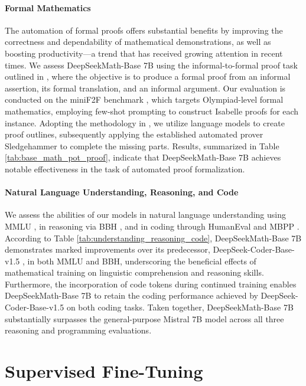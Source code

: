 \begin{itemize}[topsep=0pt]
\paragraph{Formal Mathematics}

The automation of formal proofs offers substantial benefits by improving the correctness and dependability of mathematical demonstrations, as well as boosting productivity—a trend that has received growing attention in recent times. We assess DeepSeekMath-Base 7B using the informal-to-formal proof task outlined in \citep{dsp_proof}, where the objective is to produce a formal proof from an informal assertion, its formal translation, and an informal argument. Our evaluation is conducted on the miniF2F benchmark \citep{minif2f}, which targets Olympiad-level formal mathematics, employing few-shot prompting to construct Isabelle proofs for each instance. Adopting the methodology in \cite{dsp_proof}, we utilize language models to create proof outlines, subsequently applying the established automated prover Sledgehammer \citep{sledgehammer} to complete the missing parts. Results, summarized in Table \ref{tab:base_math_pot_proof}, indicate that DeepSeekMath-Base 7B achieves notable effectiveness in the task of automated proof formalization.

\paragraph{Natural Language Understanding, Reasoning, and Code}

We assess the abilities of our models in natural language understanding using MMLU \citep{mmlu}, in reasoning via BBH \citep{bbh}, and in coding through HumanEval \citep{codex} and MBPP \citep{mbpp}. According to Table \ref{tab:understanding_reasoning_code}, DeepSeekMath-Base 7B demonstrates marked improvements over its predecessor, DeepSeek-Coder-Base-v1.5 \citep{deepseek-coder}, in both MMLU and BBH, underscoring the beneficial effects of mathematical training on linguistic comprehension and reasoning skills. Furthermore, the incorporation of code tokens during continued training enables DeepSeekMath-Base 7B to retain the coding performance achieved by DeepSeek-Coder-Base-v1.5 on both coding tasks. Taken together, DeepSeekMath-Base 7B substantially surpasses the general-purpose Mistral 7B model \citep{mistral} across all three reasoning and programming evaluations.

\section{Supervised Fine-Tuning}


\end{itemize}
